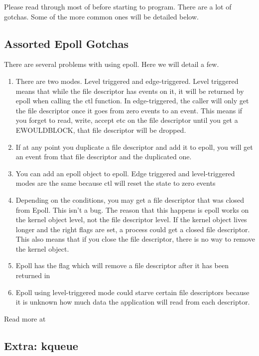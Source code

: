 Please read through most of  before starting to program.
There are a lot of gotchas.
Some of the more common ones will be detailed below.

\subsection{Assorted Epoll Gotchas}

There are several problems with using epoll. Here we will detail a few.

\begin{enumerate}
\item There are two modes. Level triggered and edge-triggered. Level triggered means that while the file descriptor has events on it, it will be returned by epoll when calling the ctl function. In edge-triggered, the caller will only get the file descriptor once it goes from zero events to an event.
  This means if you forget to read, write, accept etc on the file descriptor until you get a EWOULDBLOCK, that file descriptor will be dropped.
\item If at any point you duplicate a file descriptor and add it to epoll, you will get an event from that file descriptor and the duplicated one.
\item You can add an epoll object to epoll. Edge triggered and level-triggered modes are the same because ctl will reset the state to zero events
\item Depending on the conditions, you may get a file descriptor that was closed from Epoll. This isn't a bug. The reason that this happens is epoll works on the kernel object level, not the file descriptor level.
  If the kernel object lives longer and the right flags are set, a process could get a closed file descriptor.
  This also means that if you close the file descriptor, there is no way to remove the kernel object.
\item Epoll has the  flag which will remove a file descriptor after it has been returned in 
\item Epoll using level-triggered mode could starve certain file descriptors because it is unknown how much data the application will read from each descriptor.
\end{enumerate}

Read more at 

\subsection{Extra: kqueue}

